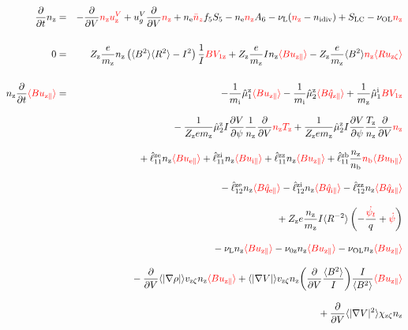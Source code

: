 \documentclass[11pt]{article}
\def\r#1{{\rm#1}}
\def\aves#1{\langle#1\rangle}
\def\dd#1#2{\frac{\partial #1}{\partial #2}}
\def\para{\parallel}
\def\ddV{\frac{\partial}{\partial V}}
\def\ddt{\frac{\partial}{\partial t}}
\def\psid{\dot{\psi}}
\def\psit{\psi_t}
\def\psitd{\dot{\psit}}
\def\mi{m_\r{i}}
\def\mz{m_\r{z}}
\def\nee{n_\r{e}}
\def\nz{n_\r{z}}
\def\nb{n_\r{b}}
\def\Tz{T_\r{z}}
\def\Zz{Z_\r{z}}
\def\uzt#1{u_{\r{#1}\zeta}}
\def\upara#1{u_{\r{#1}\para}}
\def\qhatpara#1{\hat{q}_{\r{#1}\para}}
\def\uV#1{u_\r{#1}^V}
\def\ugV{u_{g}^V}
\def\chis#1{\chi_\r{#1}}
\def\nun#1{\nu_\r{0#1}}
\def\ndiv#1{n_\r{#1div}}
\def\bri{\aves{B^2}\aves{R^2} - I^2}
\def\nnz{\bar{n}_{z}}
\def\nuL{\nu_\r{L}}
\def\nuOL{\nu_\r{OL}}
\def\red#1{\textcolor{red}{#1}}
\begin{document}

%
\begin{eqnarray}
  \ddt \nz &=&
%
  - \ddV \red{\nz\uV{z}}
%
  + \ugV \ddV \red{\nz}
%
  + \nee \red{\nnz} f_5S_5 - \nee \red{\nz} A_6 
%
  - \nuL (\red{\nz} - \ndiv{i}) 
%
  + S_\r{LC}
%
  - \nuOL \red{\nz}
%
\\[5mm]
  0 &=&
%
    \Zz \frac{e}{\mz} \nz \left( \bri \right) \frac{1}{I} \red{B V_{1\r{z}}}
%
  + \Zz \frac{e}{\mz} I \nz \red{\aves{B\upara{z}}}
%
  - \Zz \frac{e}{\mz} \aves{B^2} \red{\nz \aves{R\uzt{z}}}
\\[5mm]
  \nz \ddt \red{\aves{B \upara{z}}} &=&
%
  - \frac{1}{\mi} \hat{\mu}_1^\r{z} \red{\aves{B \upara{z}}}
  - \frac{1}{\mi} \hat{\mu}_2^\r{z} \red{\aves{B \qhatpara{z}}}
%
  + \frac{1}{\mz} \hat{\mu}_1^\r{i} \red{B V_{1\r{z}}} 
\nonumber\\[3mm]&&{}
%
  - \frac{1}{\Zz e\mz} \hat{\mu}_2^\r{z} I \dd{V}{\psi} \frac{1}{\nz}
  \ddV \red{\nz\Tz}
  + \frac{1}{\Zz e\mz} \hat{\mu}_2^\r{z} I \dd{V}{\psi} \frac{\Tz}{\nz}
  \ddV \red{\nz}
\nonumber\\[3mm]&&{}
%
  + \hat{\ell}_{11}^{\r{ze}} \nz \red{\aves{B \upara{e}}}
  + \hat{\ell}_{11}^{\r{zi}} \nz \red{\aves{B \upara{i}}}
  + \hat{\ell}_{11}^{\r{zz}} \nz \red{\aves{B \upara{z}}}
  + \hat{\ell}_{11}^{\r{zb}} \frac{\nz}{\nb} \red{\nb \aves{B \upara{b}}}
\nonumber\\[3mm]&&{}
%
  - \hat{\ell}_{12}^{\r{ze}} \nz \red{\aves{B \qhatpara{e}}}
  - \hat{\ell}_{12}^{\r{zi}} \nz \red{\aves{B \qhatpara{i}}}
  - \hat{\ell}_{12}^{\r{zz}} \nz \red{\aves{B \qhatpara{z}}}
\nonumber\\[3mm]&&{}
%
  + \Zz e \frac{\nz}{\mz} I \aves{R^{-2}} \left( - \frac{\red{\psitd}}{q} + \red{\psid} \right)
%
%
\nonumber\\[3mm]&&{}
%
  - \nuL  \nz \red{\aves{B \upara{z}}}
%
  - \nun{z} \nz \red{\aves{B \upara{z}}}
%
  - \nuOL \nz \red{\aves{B \upara{z}}}
\nonumber\\[3mm]&&{}
%
  - \ddV \aves{|\nabla \rho|} v_{\r{z}\zeta} \nz \red{\aves{B \upara{z}}}
%
  + \aves{|\nabla V|} v_{\r{z}\zeta} \nz 
  \biggl(\ddV \frac{\aves{B^2}}{I} \biggl) \frac{I}{\aves{B^2}} \red{\aves{B \upara{z}}}
\nonumber\\[3mm]&&{}
%
  + \ddV \aves{|\nabla V|^2} \chis{z\zeta} \nz

\end{eqnarray}
\end{document}
